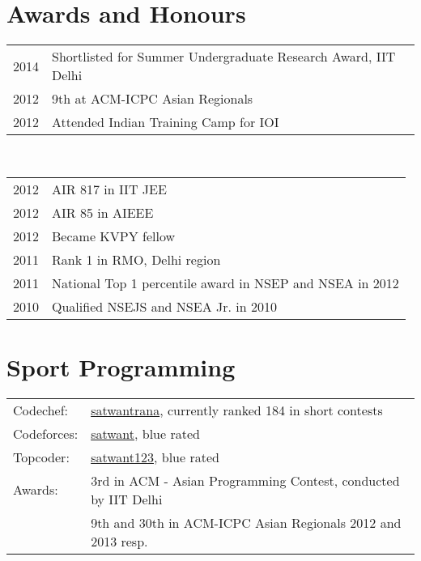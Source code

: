 \documentclass[a4paper,10pt]{article} %
\begin{document}

\section{Awards and Honours}

\begin{tabular}{rl}
2014 & Shortlisted for Summer Undergraduate Research Award, IIT Delhi\\
2012 & 9th at ACM-ICPC Asian Regionals\\
2012 & Attended Indian Training Camp for IOI\\
\end{tabular}\\
\begin{tabular}{rl}
2012 & AIR 817 in IIT JEE\\
2012 & AIR 85 in AIEEE\\
2012 & Became KVPY fellow\\
2011 & Rank 1 in RMO, Delhi region\\
2011 & National Top 1 percentile award in NSEP and NSEA in 2012\\
2010 & Qualified NSEJS and NSEA Jr. in 2010\\

\end{tabular}


\section{Sport Programming}

\begin{tabular}{ll}
Codechef: & \href{http://www.codechef.com/users/satwantrana}{satwantrana}, currently ranked 184 in short contests\\
Codeforces: & \href{http://codeforces.com/profile/satwant}{satwant}, blue rated\\
Topcoder: & \href{http://community.topcoder.com/tc?module=MemberProfile&cr=23152984}{satwant123}, blue rated\\
Awards: & 3rd in ACM - Asian Programming Contest, conducted by IIT Delhi\\
& 9th and 30th in ACM-ICPC Asian Regionals 2012 and 2013 resp.

\end{tabular}
\end{document}
